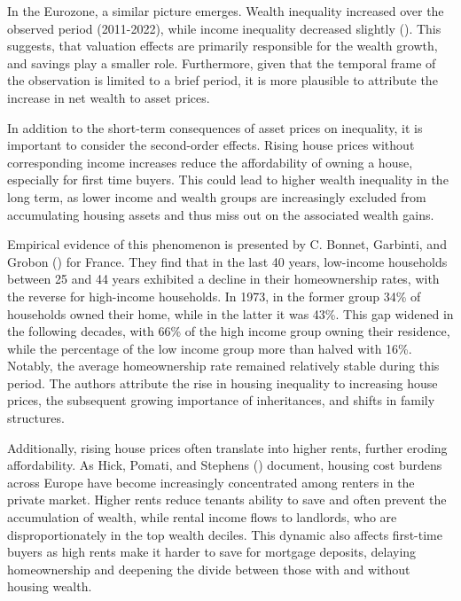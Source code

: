 \documentclass[
  a4paper,
  DIV=11,
  numbers=noendperiod]{scrartcl}
\begin{document}
In the Eurozone, a similar picture emerges. Wealth inequality increased
over the observed period (2011-2022), while income inequality decreased
slightly (). This suggests, that valuation effects are primarily responsible
for the wealth growth, and savings play a smaller role. Furthermore,
given that the temporal frame of the observation is limited to a brief
period, it is more plausible to attribute the increase in net wealth to
asset prices.

In addition to the short-term consequences of asset prices on
inequality, it is important to consider the second-order effects. Rising
house prices without corresponding income increases reduce the
affordability of owning a house, especially for first time buyers. This
could lead to higher wealth inequality in the long term, as lower income
and wealth groups are increasingly excluded from accumulating housing
assets and thus miss out on the associated wealth gains.

Empirical evidence of this phenomenon is presented by C. Bonnet,
Garbinti, and Grobon
() for France.
They find that in the last 40 years, low-income households between 25
and 44 years exhibited a decline in their homeownership rates, with the
reverse for high-income households. In 1973, in the former group 34\% of
households owned their home, while in the latter it was 43\%. This gap
widened in the following decades, with 66\% of the high income group
owning their residence, while the percentage of the low income group
more than halved with 16\%. Notably, the average homeownership rate
remained relatively stable during this period. The authors attribute the
rise in housing inequality to increasing house prices, the subsequent
growing importance of inheritances, and shifts in family structures.

Additionally, rising house prices often translate into higher rents,
further eroding affordability. As Hick, Pomati, and Stephens
() document,
housing cost burdens across Europe have become increasingly concentrated
among renters in the private market. Higher rents reduce tenants ability
to save and often prevent the accumulation of wealth, while rental
income flows to landlords, who are disproportionately in the top wealth
deciles. This dynamic also affects first-time buyers as high rents make
it harder to save for mortgage deposits, delaying homeownership and
deepening the divide between those with and without housing wealth.
\end{document}
